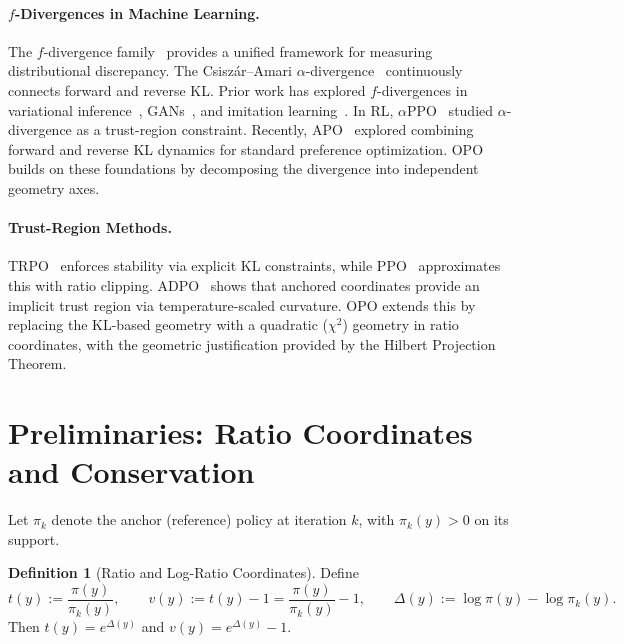 \documentclass[11pt]{article}
\theoremstyle{definition}
\newtheorem{definition}[theorem]{Definition}
\theoremstyle{remark}
\newcommand{\pik}{\pi_k}
\begin{document}
\paragraph{$f$-Divergences in Machine Learning.}
The $f$-divergence family~\cite{Csiszar1967,AliSilvey1966} provides a unified framework for measuring distributional discrepancy. The Csisz\'ar--Amari $\alpha$-divergence~\cite{Csiszar1967,Amari2016} continuously connects forward and reverse KL. Prior work has explored $f$-divergences in variational inference~\cite{Li2016Renyi}, GANs~\cite{Nowozin2016fGAN}, and imitation learning~\cite{Ghasemipour2020fIL}. In RL, $\alpha$PPO~\cite{Xu2023AlphaPPO} studied $\alpha$-divergence as a trust-region constraint. Recently, APO~\cite{zixian2025apo} explored combining forward and reverse KL dynamics for standard preference optimization. OPO builds on these foundations by decomposing the divergence into independent geometry axes.

\paragraph{Trust-Region Methods.}
TRPO~\cite{Schulman2015TRPO} enforces stability via explicit KL constraints, while PPO~\cite{Schulman2017PPO} approximates this with ratio clipping. ADPO~\cite{Wang2025ADPO} shows that anchored coordinates provide an implicit trust region via temperature-scaled curvature. OPO extends this by replacing the KL-based geometry with a quadratic ($\chi^2$) geometry in ratio coordinates, with the geometric justification provided by the Hilbert Projection Theorem.

\section{Preliminaries: Ratio Coordinates and Conservation}
\label{sec:prelim}

Let $\pik$ denote the anchor (reference) policy at iteration $k$, with $\pik(y)>0$ on its support.

\begin{definition}[Ratio and Log-Ratio Coordinates]
\label{def:ratio_coords}
Define
\begin{equation}
t(y) := \frac{\pi(y)}{\pik(y)}, \qquad
v(y) := t(y)-1 = \frac{\pi(y)}{\pik(y)}-1,
\qquad
\Delta(y) := \log\pi(y)-\log\pik(y).
\end{equation}
Then $t(y)=e^{\Delta(y)}$ and $v(y)=e^{\Delta(y)}-1$.
\end{definition}
\end{document}
